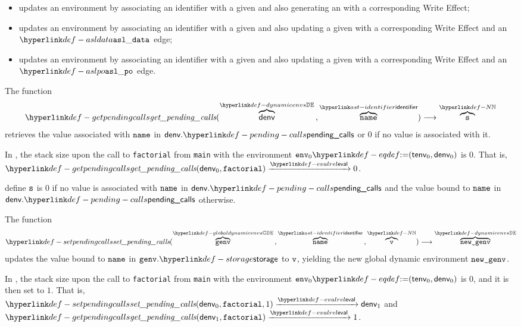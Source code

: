 \begin{itemize}
  \item {} updates an environment by associating an identifier with a given \nativevalue{}
        and also generating an \executiongraph{} with a corresponding Write Effect;
  \item {} updates an environment by associating an identifier with a given \nativevalue{}
        and also updating a given \executiongraph{} with a corresponding Write Effect and an $\asldata$ edge;
  \item {} updates an environment by associating an identifier with a given \nativevalue{}
        and also updating a given \executiongraph{} with a corresponding Write Effect and an $\aslpo$ edge.
\end{itemize}

\hypertarget{def-getpendingcalls}{}
The function
\[
\getpendingcalls(\overname{\denv}{\dynamicenvs} \aslsep \overname{\name}{\identifier}) \aslto \overname{\vs}{\N}
\]
retrieves the value associated with $\name$ in $\denv.\pendingcalls$ or $0$ if no value is associated with it.

In , the stack size upon the call to \verb|factorial| from \verb|main|
with the environment $\env_0 \eqdef (\tenv_0, \denv_0)$ is $0$.
That is, $\getpendingcalls(\denv_0, \factorial) \evalarrow 0$.

\ProseParagraph
define $\vs$ is $0$ if no value is associated with $\name$ in $\denv.\pendingcalls$ and the value bound to
$\name$ in $\denv.\pendingcalls$ otherwise.

\FormallyParagraph
\begin{mathpar}
\end{mathpar}

\hypertarget{def-setpendingcalls}{}
The function
\[
\setpendingcalls(\overname{\genv}{\globaldynamicenvs} \aslsep \overname{\name}{\identifier} \aslsep \overname{\vv}{\N}) \aslto
\overname{\newgenv}{\dynamicenvs}
\]
updates the value bound to $\name$ in $\genv.\storage$ to $\vv$, yielding the new global dynamic environment $\newgenv$.

In , the stack size upon the call to \verb|factorial| from \verb|main|
with the environment $\env_0 \eqdef (\tenv_0, \denv_0)$ is $0$, and it is then set to $1$.
That is, \\
$\setpendingcalls(\denv_0, \factorial, 1) \evalarrow \denv_1$
and\\
$\getpendingcalls(\denv_1, \factorial) \evalarrow 1$.

